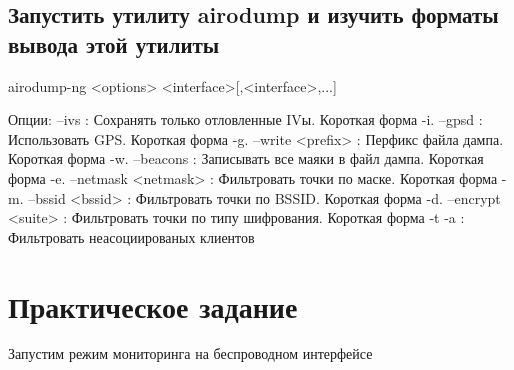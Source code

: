 \documentclass[10pt,a4paper]{report}
\begin{document}
		\subsection{Запустить утилиту airodump и изучить форматы вывода этой утилиты}
	airodump-ng <options> <interface>[,<interface>,...]

Опции:
--ivs : Сохранять только отловленные IVы. Короткая форма -i.
--gpsd : Использовать GPS. Короткая форма -g.
--write <prefix> : Перфикс файла дампа. Короткая форма -w.
--beacons : Записывать все маяки в файл дампа. Короткая форма -e.
--netmask <netmask> : Фильтровать точки по маске. Короткая форма -m.
--bssid <bssid> : Фильтровать точки по BSSID. Короткая форма -d.
--encrypt <suite> : Фильтровать точки по типу шифрования.
Короткая форма -t
-a : Фильтровать неасоциированых клиентов
	\section{Практическое задание}
		Запустим режим мониторинга на беспроводном интерфейсе
\end{document}
